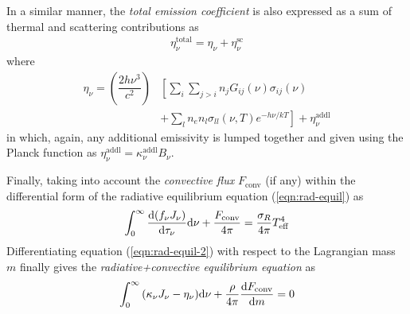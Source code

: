 				In a similar manner, the \textit{total emission coefficient} is also expressed as a sum of thermal and scattering contributions as
				\begin{align}
					\eta_\nu^\text{total}=\eta_\nu+\eta_\nu^\text{sc} \label{eqn:em-coeff}
				\end{align}
				where
				\begin{align}
					\eta_\nu=\left(\dfrac{2h\nu^3}{c^2}\right)&\left[ \sum_{i}\sum_{j>i}{n_jG_{ij}(\nu)\sigma_{ij}(\nu)} \right. \nonumber\\
									&\left.+\sum_{l}{n_en_l\sigma_{ll}(\nu,T)e^{-h\nu/kT}}\right]+\eta_\nu^\text{addl} \label{eqn:ext-em-coeff}
				\end{align}
				in which, again, any additional emissivity is lumped together and given using the Planck function as $\eta_\nu^\text{addl}=\kappa_\nu^\text{addl}B_\nu$.
				
				Finally, taking into account the \textit{convective flux} $F_\text{conv}$ (if any) within the differential form of the radiative equilibrium equation (\ref{eqn:rad-equil}) as
				\begin{align}
					\int_{0}^{\infty}{\dfrac{\mathrm{d}(f_\nu J_\nu)}{\mathrm{d}\tau_\nu}\mathrm{d}\nu}+\dfrac{F_\text{conv}}{4\pi}=\dfrac{\sigma_R}{4\pi}T_\text{eff}^4 \label{eqn:rad-equil-2}
				\end{align}
				Differentiating equation (\ref{eqn:rad-equil-2}) with respect to the Lagrangian mass $m$ finally gives the \textit{radiative+convective equilibrium equation} as
				\begin{align}
					\int_{0}^{\infty}{(\kappa_\nu J_\nu-\eta_\nu)\mathrm{d}\nu}+\dfrac{\rho}{4\pi}\dfrac{\mathrm{d}F_\text{conv}}{\mathrm{d}m}=0 \label{eqn:rad-conv-equil}
				\end{align}
    		
